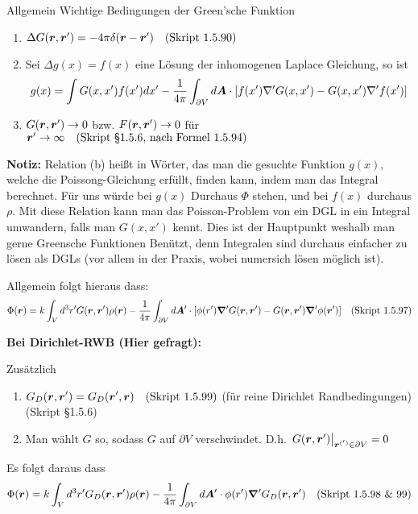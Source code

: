 \begin{enumerate}
        Allgemein Wichtige Bedingungen der Green'sche Funktion
        \begin{center}
          \begin{enumerate}
            \item $\Delta G(\vb* r, \vb* r') = -4\pi\delta(\vb* r -\vb* r')
              \quad\text{(Skript 1.5.90)}$
            \item Sei $\Delta g(x) = f(x)$ eine Lösung der inhomogenen  
              Laplace Gleichung, so ist 
              $$ g(x)=\int G(x,x')f(x')dx'
              -\frac{1}{4\pi}\int_{\partial V}d\vb*A\cdot
              \qty[f(x')\nabla' G(x,x') - G(x,x')\nabla' f(x')]$$
            \item $G(\vb* r, \vb* r') \to 0$ bzw. $F(\vb* r, \vb* r')\to 0$ 
              für $\vb* r'\to\infty 
              \quad\text{(Skript §1.5.6, nach Formel 1.5.94)}$
          \end{enumerate}
        \end{center}
        \textbf{Notiz:} Relation (b) heißt in Wörter, das man die gesuchte
        Funktion $g(x)$, welche die Poissong-Gleichung erfüllt, finden
        kann, indem man das Integral berechnet. Für uns würde bei $g(x)$
        Durchaus $\Phi$ stehen, und bei $f(x)$ durchaus $\rho$.
        Mit diese Relation kann man das 
        Poisson-Problem
        von ein DGL in ein Integral umwandern, falls man $G(x,x')$ kennt.
        Dies ist der Hauptpunkt weshalb man gerne Greensche Funktionen
        Benützt, denn Integralen sind durchaus einfacher 
        zu lösen als DGLs (vor allem in der Praxis, wobei numersich
        lösen möglich ist).

        Allgemein folgt hieraus dass:
        \begin{equation*}
          \displaystyle \Phi(\vb* r)=k\int_V d^3r' G(\vb* r, \vb* r')\rho(\vb* r)
         -\frac{1}{4\pi}\int_{\partial V}d\vb* A'
         \cdot\qty[
         \phi(r')\grad' G(\vb* r, \vb* r')
         -G(\vb* r, \vb* r')\grad'\phi(\vb*r') 
         ] \quad\text{(Skript 1.5.97)}
        \end{equation*}

        \textbf{Bei Dirichlet-RWB (Hier gefragt):}

        Zusätzlich
        \begin{center}
        \begin{enumerate}
          \item $\displaystyle G_D(\vb* r, \vb* r')= G_D(\vb* r', \vb* r)
            \quad\text{(Skript 1.5.99)}$ 
            (für reine Dirichlet Randbedingungen) (Skript §1.5.6)
          \item Man wählt $G$ so, sodass $G$ auf $\partial V$ 
            verschwindet. D.h. 
            $\eval{G(\vb*r,\vb*r')}_{\vb*r^{(')}\in\partial V}=0$
        \end{enumerate}
        \end{center}
        Es folgt daraus dass
        \begin{equation*}
          \displaystyle \Phi(\vb* r)=k\int_V d^3r' G_D(\vb* r, \vb* r')\rho(\vb* r)
         -\frac{1}{4\pi}\int_{\partial V}d\vb* A'\cdot\phi(r')
         \grad' G_D(\vb* r, \vb* r') \quad\text{(Skript 1.5.98 \& 99)}
        \end{equation*}        


\end{enumerate}
